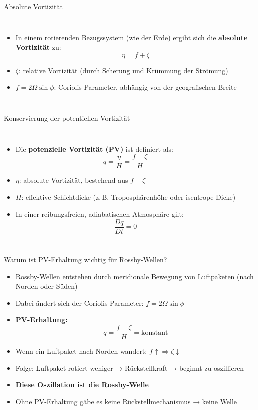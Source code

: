 \begin{frame}{Absolute Vortizität}
	\begin{columns}
		\begin{itemize}
			\item In einem rotierenden Bezugssystem (wie der Erde) ergibt sich die \textbf{absolute Vortizität} zu:
			      \[
				      \eta = f + \zeta
			      \]
			\item \( \zeta \): relative Vortizität (durch Scherung und Krümmung der Strömung)
			\item \( f = 2\Omega \sin\phi \): Coriolis-Parameter, abhängig von der geografischen Breite
		\end{itemize}

		\vspace{2cm}
	\end{columns}
\end{frame}


\begin{frame}{Konservierung der potentiellen Vortizität}
	\begin{columns}
		\column{0.99\textwidth}
		\begin{itemize}
			\item Die \textbf{potenzielle Vortizität (PV)} ist definiert als:
			      \[
				      q = \frac{\eta}{H} = \frac{f + \zeta}{H}
			      \]
			\item \( \eta \): absolute Vortizität, bestehend aus \( f + \zeta \)
			\item \( H \): effektive Schichtdicke (z.\,B. Troposphärenhöhe oder isentrope Dicke)
			\item In einer reibungsfreien, adiabatischen Atmosphäre gilt:
			      \[
				      \frac{Dq}{Dt} = 0
			      \]
		\end{itemize}

		\column{0.4\textwidth}
		\vspace{2cm}
	\end{columns}
\end{frame}


\begin{frame}{Warum ist PV-Erhaltung wichtig für Rossby-Wellen?}
	\begin{itemize}
		\item Rossby-Wellen entstehen durch meridionale Bewegung von Luftpaketen (nach Norden oder Süden)
		\item Dabei ändert sich der Coriolis-Parameter: \( f = 2\Omega \sin\phi \)
		\item \textbf{PV-Erhaltung:} \[ q = \frac{f + \zeta}{H} = \text{konstant} \]
		\item Wenn ein Luftpaket nach Norden wandert: \( f \uparrow \Rightarrow \zeta \downarrow \)
		\item Folge: Luftpaket rotiert weniger → Rückstellkraft → beginnt zu oszillieren
		\item \textbf{Diese Oszillation ist die Rossby-Welle}
		\item Ohne PV-Erhaltung gäbe es keine Rückstellmechanismus → keine Welle
	\end{itemize}
\end{frame}


